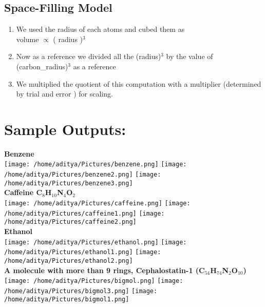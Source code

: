 \documentclass{report}
\begin{document}
\subsection*{Space-Filling Model}
\begin{enumerate}


\item We used the radius of each atoms and cubed them as \\
volume $\propto$ ( radius )$^3$
\item Now as a reference we divided all the (radius)$^3$ by the value of (carbon\_radius)$^3$ as a reference
\item We multiplied the quotient of this computation with a multiplier (determined by trial and error ) for scaling.
\end{enumerate}
\section*{Sample Outputs:}
\textbf{Benzene}\\
\texttt{[image: /home/aditya/Pictures/benzene.png]}
\texttt{[image: /home/aditya/Pictures/benzene2.png]}
\texttt{[image: /home/aditya/Pictures/benzene3.png]}\\
\textbf{Caffeine C$_8$H$_10$N$_4$O$_2$}\\
\texttt{[image: /home/aditya/Pictures/caffeine.png]}
\texttt{[image: /home/aditya/Pictures/caffeine1.png]}
\texttt{[image: /home/aditya/Pictures/caffeine2.png]}\\
\textbf{Ethanol}\\
\texttt{[image: /home/aditya/Pictures/ethanol.png]}
\texttt{[image: /home/aditya/Pictures/ethanol1.png]}
\texttt{[image: /home/aditya/Pictures/ethanol2.png]}\\
\textbf{A molecule with more than 9 rings, Cephalostatin-1 (C$_54$H$_74$N$_2$O$_10$)}\\
\texttt{[image: /home/aditya/Pictures/bigmol.png]}
\texttt{[image: /home/aditya/Pictures/bigmol3.png]}
\texttt{[image: /home/aditya/Pictures/bigmol1.png]}\\
\\
\end{document}
